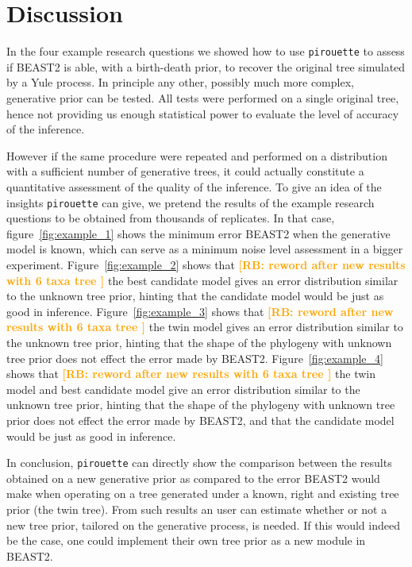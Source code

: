 \documentclass{article}
\newcommand{\richel}[1]{\textcolor{orange}{\textbf{[RB: #1]}}}
\begin{document}
\section{Discussion}

In the four example research questions we showed how to use \verb;pirouette; 
to assess if BEAST2 is able, with a birth-death prior, 
to recover the original tree simulated by a Yule process. 
In principle any other, possibly much more complex, 
generative prior can be tested.
All tests were performed on a single original tree, 
hence not providing us enough statistical power to 
evaluate the level of accuracy of the inference. 

However if the same procedure were repeated and performed on a distribution 
with a sufficient number of generative trees, 
it could actually constitute a quantitative assessment 
of the quality of the inference.
To give an idea of the insights \verb;pirouette; can give,
we pretend the results of the example research questions
to be obtained from thousands of replicates.
In that case, figure~\ref{fig:example_1} shows 
the minimum error BEAST2 when the
generative model is known, which can serve as 
a minimum noise level assessment in a bigger experiment.  
Figure~\ref{fig:example_2} shows that 
\richel{
  reword after new results with 6 taxa tree
} 
the best candidate model gives an error distribution similar to the unknown tree prior,
hinting that the candidate model would be just as good in inference.
Figure~\ref{fig:example_3} shows that 
\richel{
  reword after new results with 6 taxa tree
} 
the twin model gives an error distribution similar to the unknown tree prior,
hinting that the shape of the phylogeny with unknown tree prior
does not effect the error made by BEAST2.
Figure~\ref{fig:example_4} shows that 
\richel{
  reword after new results with 6 taxa tree
} 
the twin model and best candidate model give 
an error distribution similar to the unknown tree prior,
hinting that the shape of the phylogeny with unknown tree prior
does not effect the error made by BEAST2, 
and that the candidate model would be just as good in inference.

In conclusion, \verb;pirouette; can directly show 
the comparison between the results obtained 
on a new generative prior as compared to the error BEAST2 
would make when operating on a tree generated 
under a known, right and existing tree prior (the twin tree).
From such results an user can estimate whether or not a new tree prior, 
tailored on the generative process, is needed. 
If this would indeed be the case, 
one could implement their own tree prior as a new module in BEAST2.
\end{document}
